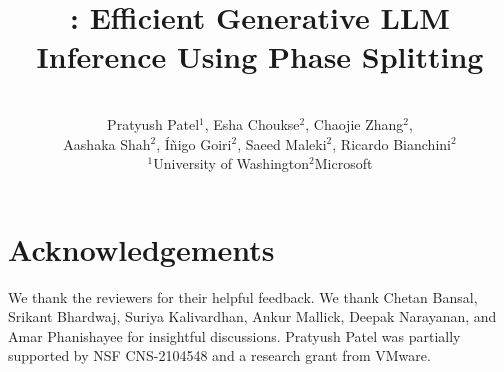 \documentclass[conference]{IEEEtran}
\title{\papername: Efficient Generative LLM Inference Using Phase Splitting}
\author{\\
Pratyush Patel$^1$,
Esha Choukse$^2$,
Chaojie Zhang$^2$,
\\
Aashaka Shah$^2$,
\'{I}\~{n}igo Goiri$^2$,
Saeed Maleki$^2$,
Ricardo Bianchini$^2$
\vspace{.15in}
\\
$^1$University of Washington\hspace{.4in}$^2$Microsoft 
}
\begin{document}
%

\maketitle
\thispagestyle{plain}
\pagestyle{plain}
\setcounter{page}{1}






%
%
%
%








\section*{Acknowledgements}
We thank the reviewers for their helpful feedback.
We thank Chetan Bansal, Srikant Bhardwaj, Suriya Kalivardhan, Ankur Mallick, Deepak Narayanan, and Amar Phanishayee for insightful discussions.
Pratyush Patel was partially supported by NSF CNS-2104548 and a research grant from VMware.








\end{document}
